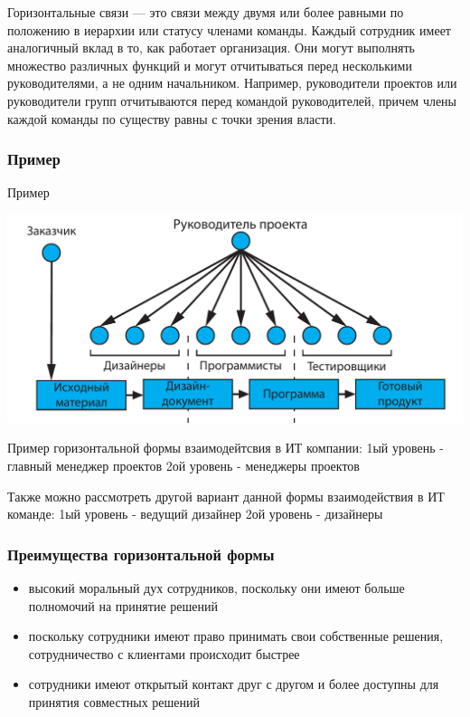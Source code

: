 \documentclass{../industrial-development}
\begin{document}
\lecturenotes
Горизонтальные связи — это связи между двумя или более равными по положению в иерархии или статусу членами команды. Каждый сотрудник имеет аналогичный вклад в то, как работает организация. Они могут выполнять множество различных функций и могут отчитываться перед несколькими руководителями, а не одним начальником. Например, руководители проектов или руководители групп отчитываются перед командой руководителей, причем члены каждой команды по существу равны с точки зрения власти.

\begin{frame} \frametitle{Пример}
  \begin{block}{Пример}
\centerline{\includegraphics[width=1\textwidth]{horizontal.pdf}}
  \end{block}
\end{frame}

\lecturenotes
Пример горизонтальной формы взаимодейтсвия в ИТ компании:
1ый уровень - главный менеджер проектов
2ой уровень - менеджеры проектов

Также можно рассмотреть другой вариант данной формы взаимодействия в ИТ команде:
1ый уровень -  ведущий дизайнер
2ой уровень - дизайнеры

\begin{frame} \frametitle{Преимущества горизонтальной формы}
  
  \begin{itemize}
  \item высокий моральный дух сотрудников, поскольку они имеют больше полномочий на принятие решений
  \item поскольку сотрудники  имеют право принимать свои собственные решения, сотрудничество с клиентами происходит быстрее
  \item сотрудники имеют открытый контакт друг с другом и более доступны для принятия совместных решений
  \end{itemize}
\end{frame}
\end{document}
